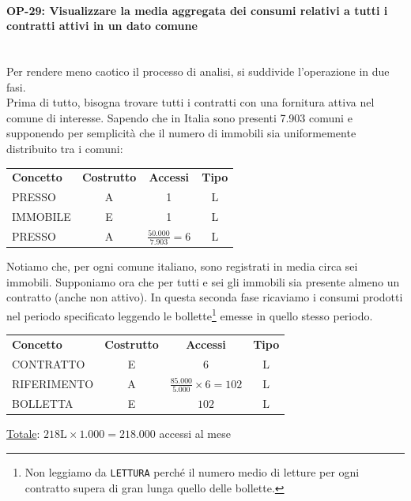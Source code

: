 \documentclass[a4paper,12pt]{report}
\begin{document}
\paragraph{OP-29: Visualizzare la media aggregata dei consumi relativi a tutti i contratti attivi in un dato comune}\mbox{}\\
    Per rendere meno caotico il processo di analisi, si suddivide l'operazione in due fasi.\\
    Prima di tutto, bisogna trovare tutti i contratti con una fornitura attiva nel comune di interesse. Sapendo che in Italia sono presenti 7.903 comuni e supponendo per semplicità che il numero di immobili sia uniformemente distribuito tra i comuni:
    \begin{center}
    \begin{tabular}{@{}l c  c  c@{}}
        \hline
        \textbf{Concetto} & \textbf{Costrutto} & \textbf{Accessi} & \textbf{Tipo} \\ [0.5ex]
        PRESSO & A & 1 & L \\
        IMMOBILE & E & 1 & L \\
        PRESSO & A & $\frac{50.000}{7.903} = 6$ & L \\
        \hline
    \end{tabular}
    \end{center}
    Notiamo che, per ogni comune italiano, sono registrati in media circa sei immobili. Supponiamo ora che per tutti e sei gli immobili sia presente almeno un contratto (anche non attivo). In questa seconda fase ricaviamo i consumi prodotti nel periodo specificato leggendo le bollette\footnote{Non leggiamo da \texttt{LETTURA} perché il numero medio di letture per ogni contratto supera di gran lunga quello delle bollette.} emesse in quello stesso periodo.
    \begin{center}
    \begin{tabular}{@{}l c  c  c@{}}
        \hline
        \textbf{Concetto} & \textbf{Costrutto} & \textbf{Accessi} & \textbf{Tipo} \\ [0.5ex]
        CONTRATTO & E & 6 & L \\
        RIFERIMENTO & A & $\frac{85.000}{5.000} \times 6 = 102$ & L \\
        BOLLETTA & E & $102$ & L \\
        \hline
    \end{tabular}
    \end{center}
    \underline{Totale}: $218\text{L} \times 1.000 = 218.000$ accessi al mese
\end{document}
